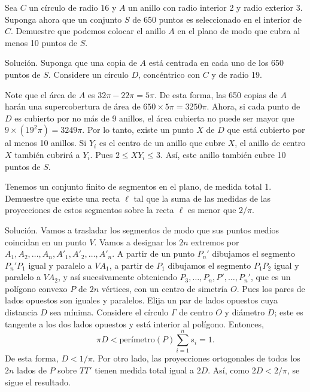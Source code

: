 \documentclass[11pt]{scrartcl}
\begin{document}
\begin{example}
    Sea \( C \) un círculo de radio 16 y \( A \) un anillo con radio interior 2 y radio exterior 3. Suponga ahora que un conjunto \( S \) de 650 puntos es seleccionado en el interior de \( C \). Demuestre que podemos colocar el anillo \( A \) en el plano de modo que cubra al menos 10 puntos de \( S \).
\end{example}
Solución. Suponga que una copia de \( A \) está centrada en cada uno de los 650 puntos de \( S \). Considere un círculo \( D \), concéntrico con \( C \) y de radio 19.

Note que el área de \( A \) es \( 32\pi - 22\pi = 5\pi \). De esta forma, las 650 copias de \( A \) harán una supercobertura de área de \( 650 \times 5\pi = 3250\pi \). Ahora, si cada punto de \( D \) es cubierto por no más de 9 anillos, el área cubierta no puede ser mayor que \( 9 \times (19^2 \pi) = 3249\pi \). Por lo tanto, existe un punto \( X \) de \( D \) que está cubierto por al menos 10 anillos. Si \( Y_i \) es el centro de un anillo que cubre \( X \), el anillo de centro \( X \) también cubrirá a \( Y_i \). Pues \( 2 \leq XY_i \leq 3 \). Así, este anillo también cubre 10 puntos de \( S \).

\begin{example}
     Tenemos un conjunto finito de segmentos en el plano, de medida total 1. Demuestre que existe una recta \( \ell \) tal que la suma de las medidas de las proyecciones de estos segmentos sobre la recta \( \ell \) es menor que \( 2/\pi \).
\end{example}
Solución. Vamos a trasladar los segmentos de modo que sus puntos medios coincidan en un punto \( V \). Vamos a designar los \( 2n \) extremos por \( A_1, A_2, \ldots, A_n, A'_1, A'_2, \ldots, A'_n \). A partir de un punto \( P_n' \) dibujamos el segmento \( P_n'P_1 \) igual y paralelo a \( VA_1 \), a partir de \( P_1 \) dibujamos el segmento \( P_1P_2 \) igual y paralelo a \( VA_2 \), y así sucesivamente obteniendo \( P_3, \ldots, P_n, P', \ldots, P_n' \), que es un polígono convexo \( P \) de \( 2n \) vértices, con un centro de simetría \( O \). Pues los pares de lados opuestos son iguales y paralelos. Elija un par de lados opuestos cuya distancia \( D \) sea mínima. Considere el círculo \( \Gamma \) de centro \( O \) y diámetro \( D \); este es tangente a los dos lados opuestos y está interior al polígono. Entonces,
\[
\pi D < \text{perímetro}(P) \sum_{i=1}^n s_i = 1.
\]
De esta forma, \( D < 1/\pi \). Por otro lado, las proyecciones ortogonales de todos los \( 2n \) lados de \( P \) sobre \( T T' \) tienen medida total igual a \( 2D \). Así, como \( 2D < 2/\pi \), se sigue el resultado.
\end{document}
